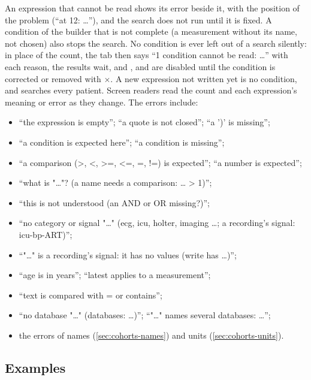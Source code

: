 An expression that cannot be read shows its error beside it, with the position of the problem
(``at 12: \dots''), and the search does not run until it is fixed. A condition of the builder
that is not complete (a measurement without its name,  not chosen) also stops the search.
No condition is ever left out of a search silently: in place of the count, the tab then says
``1 condition cannot be read: \dots'' with each reason, the results wait, and ,
 and  are disabled until the condition is corrected or removed
with $\times$. A new expression not written yet is no condition, and searches every patient.
Screen readers read the count and each expression's meaning or error as they change.
The errors include:
\begin{itemize}
\item ``the expression is empty''; ``a quote is not closed''; ``a ')' is missing'';
\item ``a condition is expected here''; ``a condition is missing'';
\item ``a comparison (>, <, >=, <=, =, !=) is expected''; ``a number is expected'';
\item ``what is "\dots"? (a name needs a comparison: \dots{} > 1)'';
\item ``this is not understood (an AND or OR missing?)'';
\item ``no category or signal "\dots" (ecg, icu, holter, imaging \dots; a recording's signal:
  icu-bp-ART)'';
\item ``"\dots" is a recording's signal: it has no values (write has \dots)'';
\item ``age is in years''; ``latest applies to a measurement'';
\item ``text is compared with = or contains'';
\item ``no database "\dots" (databases: \dots)''; ``"\dots" names several databases: \dots'';
\item the errors of names (\cref{sec:cohorts-names}) and units (\cref{sec:cohorts-units}).
\end{itemize}

\subsection{Examples}
\label{sec:cohorts-examples}

